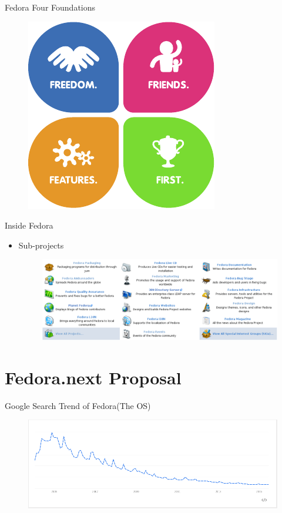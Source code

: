 \documentclass{beamer}
\begin{document}
\begin{frame}{Fedora Four Foundations}
  \begin{figure}[htbp]
    \centering
    \includegraphics[height=.7\textheight]{four_foundations.pdf}
  \end{figure}
\end{frame}

\begin{frame}{Inside Fedora}
  \begin{itemize}
    \item Sub-projects
      \begin{figure}[htbp]
        \centering
        \includegraphics[width=.9\textwidth]{subprojects.png}
      \end{figure}
  \end{itemize}
\end{frame}

\section{Fedora.next Proposal}

\begin{frame}{Google Search Trend of Fedora(The OS)}
  \begin{figure}[htbp]
    \centering
    \includegraphics[width=\textwidth]{Search_Fedora.png}
  \end{figure}
\end{frame}
\end{document}
